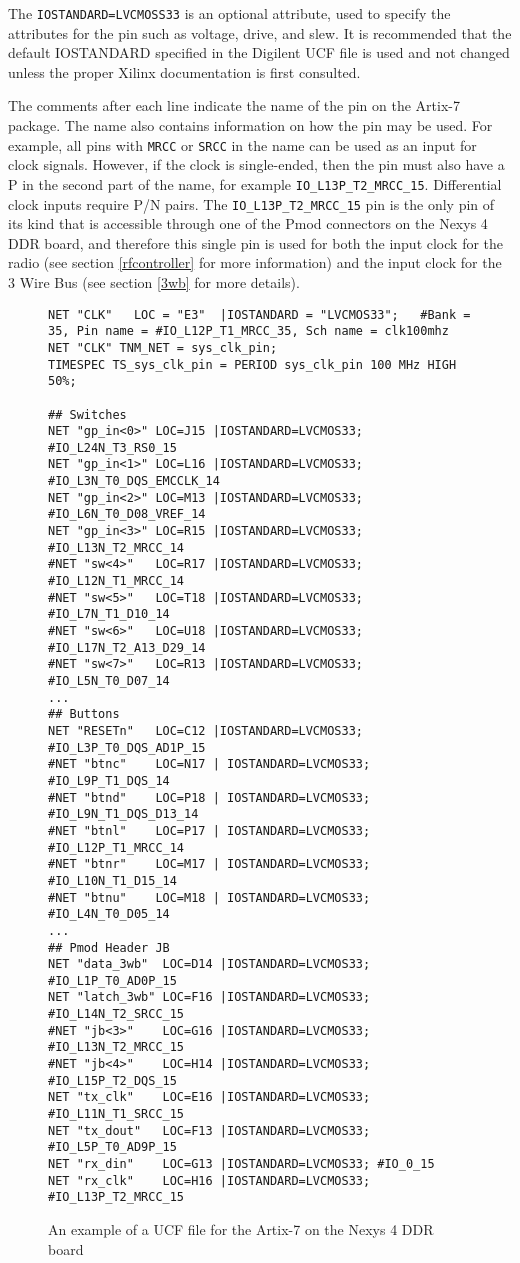 The \texttt{IOSTANDARD=LVCMOSS33} is an optional attribute, used to specify the attributes for the pin such as voltage, drive, and slew. It is recommended that the default IOSTANDARD specified in the Digilent UCF file is used and not changed unless the proper Xilinx documentation is first consulted.

The comments after each line indicate the name of the pin on the Artix-7 package. The name also contains information on how the pin may be used. For example, all pins with \texttt{MRCC} or \texttt{SRCC} in the name can be used as an input for clock signals. However, if the clock is single-ended, then the pin must also have a P in the second part of the name, for example \texttt{IO\_L13P\_T2\_MRCC\_15}. Differential clock inputs require P/N pairs. The \texttt{IO\_L13P\_T2\_MRCC\_15} pin is the only pin of its kind that is accessible through one of the Pmod connectors on the Nexys 4 DDR board, and therefore this single pin is used for both the input clock for the radio (see section \ref{rfcontroller} for more information) and the input clock for the 3 Wire Bus (see section \ref{3wb} for more details).

\begin{figure}
\begin{lstlisting}
NET "CLK"   LOC = "E3"	|IOSTANDARD = "LVCMOS33";	#Bank = 35, Pin name = #IO_L12P_T1_MRCC_35,	Sch name = clk100mhz
NET "CLK" TNM_NET = sys_clk_pin;
TIMESPEC TS_sys_clk_pin = PERIOD sys_clk_pin 100 MHz HIGH 50%; 

## Switches
NET "gp_in<0>" LOC=J15 |IOSTANDARD=LVCMOS33; #IO_L24N_T3_RS0_15
NET "gp_in<1>" LOC=L16 |IOSTANDARD=LVCMOS33; #IO_L3N_T0_DQS_EMCCLK_14
NET "gp_in<2>" LOC=M13 |IOSTANDARD=LVCMOS33; #IO_L6N_T0_D08_VREF_14
NET "gp_in<3>" LOC=R15 |IOSTANDARD=LVCMOS33; #IO_L13N_T2_MRCC_14
#NET "sw<4>"   LOC=R17 |IOSTANDARD=LVCMOS33; #IO_L12N_T1_MRCC_14
#NET "sw<5>"   LOC=T18 |IOSTANDARD=LVCMOS33; #IO_L7N_T1_D10_14
#NET "sw<6>"   LOC=U18 |IOSTANDARD=LVCMOS33; #IO_L17N_T2_A13_D29_14
#NET "sw<7>"   LOC=R13 |IOSTANDARD=LVCMOS33; #IO_L5N_T0_D07_14
...
## Buttons
NET "RESETn"   LOC=C12 |IOSTANDARD=LVCMOS33; #IO_L3P_T0_DQS_AD1P_15
#NET "btnc"    LOC=N17 | IOSTANDARD=LVCMOS33; #IO_L9P_T1_DQS_14
#NET "btnd"    LOC=P18 | IOSTANDARD=LVCMOS33; #IO_L9N_T1_DQS_D13_14
#NET "btnl"    LOC=P17 | IOSTANDARD=LVCMOS33; #IO_L12P_T1_MRCC_14
#NET "btnr"    LOC=M17 | IOSTANDARD=LVCMOS33; #IO_L10N_T1_D15_14
#NET "btnu"    LOC=M18 | IOSTANDARD=LVCMOS33; #IO_L4N_T0_D05_14
...
## Pmod Header JB
NET "data_3wb"  LOC=D14 |IOSTANDARD=LVCMOS33; #IO_L1P_T0_AD0P_15
NET "latch_3wb" LOC=F16 |IOSTANDARD=LVCMOS33; #IO_L14N_T2_SRCC_15
#NET "jb<3>"    LOC=G16 |IOSTANDARD=LVCMOS33; #IO_L13N_T2_MRCC_15
#NET "jb<4>"    LOC=H14 |IOSTANDARD=LVCMOS33; #IO_L15P_T2_DQS_15
NET "tx_clk"    LOC=E16 |IOSTANDARD=LVCMOS33; #IO_L11N_T1_SRCC_15
NET "tx_dout"   LOC=F13 |IOSTANDARD=LVCMOS33; #IO_L5P_T0_AD9P_15
NET "rx_din"    LOC=G13 |IOSTANDARD=LVCMOS33; #IO_0_15
NET "rx_clk"    LOC=H16 |IOSTANDARD=LVCMOS33; #IO_L13P_T2_MRCC_15
\end{lstlisting}
\caption{An example of a UCF file for the Artix-7 on the Nexys 4 DDR board}
\label{lst:ucf}
\end{figure}

